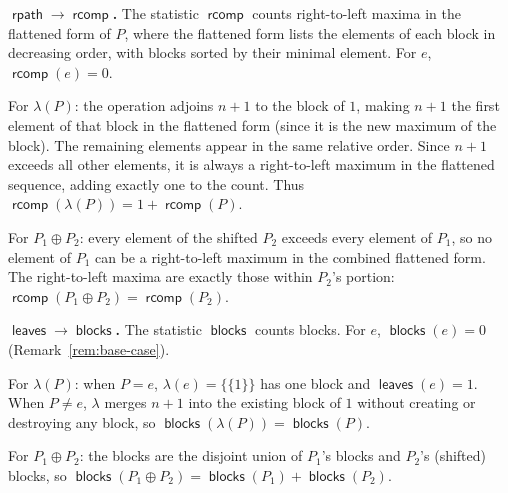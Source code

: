 \documentclass[a4paper,11pt]{article}
\theoremstyle{definition}
\DeclareMathOperator{\rcomp}{\mathsf{rcomp}}
\DeclareMathOperator{\rpath}{\mathsf{rpath}}
\DeclareMathOperator{\leaves}{\mathsf{leaves}}
\DeclareMathOperator{\blocks}{\mathsf{blocks}}
\begin{document}
\textbf{$\boldsymbol{\rpath \to \rcomp}$.}
The statistic $\rcomp$ counts right-to-left maxima in
the flattened form of $P$, where the flattened form
lists the elements of each block in decreasing order,
with blocks sorted by their minimal element. For $e$,
$\rcomp(e) = 0$.

For $\lambda(P)$: the operation adjoins $n{+}1$ to the
block of $1$, making $n{+}1$ the first element of that
block in the flattened form (since it is the new maximum
of the block). The remaining elements appear in the same
relative order. Since $n{+}1$ exceeds all other elements,
it is always a right-to-left maximum in the flattened
sequence, adding exactly one to the count. Thus
$\rcomp(\lambda(P)) = 1 + \rcomp(P)$.

For $P_1 \oplus P_2$: every element of the shifted $P_2$
exceeds every element of $P_1$, so no element of $P_1$
can be a right-to-left maximum in the combined flattened
form. The right-to-left maxima are exactly those within
$P_2$'s portion:
$\rcomp(P_1 \oplus P_2) = \rcomp(P_2)$.

\textbf{$\boldsymbol{\leaves \to \blocks}$.}
The statistic $\blocks$ counts blocks. For $e$,
$\blocks(e) = 0$ (Remark~\ref{rem:base-case}).

For $\lambda(P)$: when $P = e$,
$\lambda(e) = \{\{1\}\}$ has one block and
$\leaves(e) = 1$. When $P \neq e$, $\lambda$ merges
$n{+}1$ into the existing block of $1$ without creating
or destroying any block, so
$\blocks(\lambda(P)) = \blocks(P)$.

For $P_1 \oplus P_2$: the blocks are the disjoint union
of $P_1$'s blocks and $P_2$'s (shifted) blocks, so
$\blocks(P_1 \oplus P_2)
= \blocks(P_1) + \blocks(P_2)$.
\end{document}
